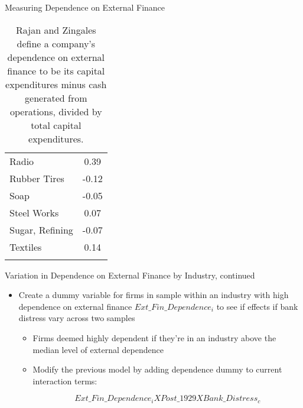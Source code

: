\documentclass[11pt]{beamer}
\begin{document}
\begin{frame}{Measuring Dependence on External Finance}
\begin{table}
{\begin{tabular}{lc}
Radio & 0.39 \\
Rubber Tires & -0.12 \\
Soap & -0.05 \\
Steel Works & 0.07 \\
Sugar, Refining & -0.07 \\
Textiles & 0.14 \\
\hline 
\hline \\[-1.8ex] 
\end{tabular}
}
\caption{\tiny{Rajan and Zingales define a company's dependence on external finance to be its capital expenditures minus cash generated from operations, divided by total capital expenditures.}}
\end{table}
\end{frame}

\begin{frame}{Variation in Dependence on External Finance by Industry, continued}
\begin{itemize}
\item Create a dummy variable for firms in sample within an industry with high dependence on external finance $Ext\_Fin\_Dependence_i$ to see if effects if bank distress vary across two samples
\begin{itemize}
\item Firms deemed highly dependent if they're in an industry above the median level of external dependence
\item Modify the previous model by adding dependence dummy to current interaction terms:

\[
 Ext\_Fin\_Dependence_iXPost\_1929XBank\_Distress_c 
\]

\end{itemize}
\end{itemize}

\end{frame}
\end{document}
